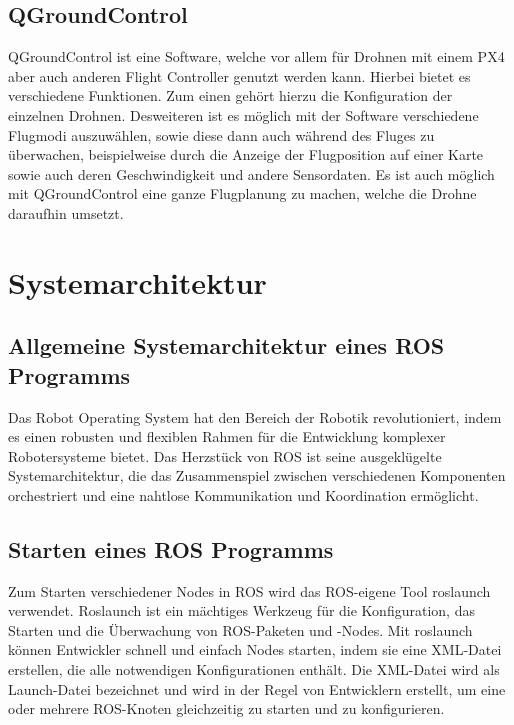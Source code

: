\subsection{QGroundControl}  \label{qGroundControl:subsection}
QGroundControl ist eine Software, welche vor allem für Drohnen mit einem PX4 aber auch anderen Flight Controller genutzt werden kann. Hierbei bietet es verschiedene Funktionen. Zum einen gehört hierzu die Konfiguration der einzelnen  Drohnen. Desweiteren ist es möglich mit der Software verschiedene Flugmodi auszuwählen, sowie diese dann auch während des Fluges zu überwachen, beispielweise durch die Anzeige der Flugposition auf einer Karte sowie auch deren Geschwindigkeit und andere Sensordaten.
Es ist auch möglich mit QGroundControl eine ganze Flugplanung zu machen, welche die Drohne daraufhin umsetzt. \cite[vgl.][]{qGroundControl}


\section{Systemarchitektur}\label{systemarchitektur:section}

\subsection{Allgemeine Systemarchitektur eines ROS Programms} \label{systemarchitektur_ros_programm:subsection}
Das Robot Operating System hat den Bereich der Robotik revolutioniert, indem es einen robusten und flexiblen Rahmen für die Entwicklung komplexer Robotersysteme bietet. Das Herzstück von \ac{ROS} ist seine ausgeklügelte Systemarchitektur, die das Zusammenspiel zwischen verschiedenen Komponenten orchestriert und eine nahtlose Kommunikation und Koordination ermöglicht.

\subsection{Starten eines ROS Programms} \label{starten eines ROS Programms:subsection}
    Zum Starten verschiedener Nodes in \ac{ROS} wird das ROS-eigene Tool roslaunch verwendet. Roslaunch ist ein mächtiges Werkzeug für die Konfiguration, das Starten und die Überwachung von ROS-Paketen und -Nodes. Mit roslaunch können Entwickler schnell und einfach Nodes starten, indem sie eine XML-Datei erstellen, die alle notwendigen Konfigurationen enthält. Die XML-Datei wird als Launch-Datei bezeichnet und wird in der Regel von Entwicklern erstellt, um eine oder mehrere ROS-Knoten gleichzeitig zu starten und zu konfigurieren.

